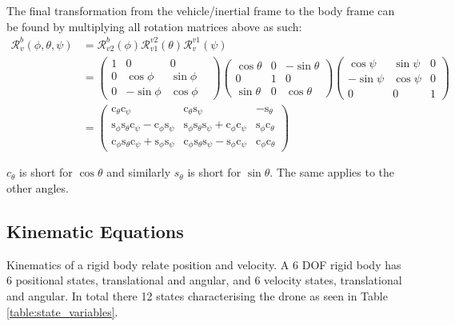 The final transformation from the vehicle/inertial frame to the body frame can be found by multiplying all rotation matrices above as such:
\begin{align}
\label{equation:trans_body_to_vehicle}
    \mathcal{R}_{v}^{b}(\phi, \theta, \psi) &= \mathcal{R}_{v2}^b(\phi)\mathcal{R}_{v1}^{v2}(\theta)\mathcal{R}_v^{v1}(\psi) &\\
    &= \begin{pmatrix}
        1 & 0 & 0\\
        0 & \cos\phi & \sin\phi &\\
        0 & -\sin\phi & \cos\phi
    \end{pmatrix}
    \begin{pmatrix}
        \cos\theta & 0 & -\sin\theta\\
        0 & 1 & 0\\
        \sin\theta & 0 &\cos\theta
    \end{pmatrix}
    \begin{pmatrix}
    \cos\psi & \sin\psi & 0\\
    -\sin\psi & \cos\psi & 0\\
    0 & 0 & 1
    \end{pmatrix} \nonumber
    \\
    &= \begin{pmatrix}
     \mbox{c}_{\theta}\mbox{c}_{\psi} & \mbox{c}_{\theta}\mbox{s}_{\psi} & -\mbox{s}_{\theta}\\
     \mbox{s}_{\phi}\mbox{s}_{\theta}\mbox{c}_{\psi} - \mbox{c}_{\phi}\mbox{s}_{\psi} & \mbox{s}_{\phi}\mbox{s}_{\theta}\mbox{s}_{\psi} + \mbox{c}_{\phi}\mbox{c}_{\psi} & \mbox{s}_{\phi}\mbox{c}_{\theta}\\
     \mbox{c}_{\phi}\mbox{s}_{\theta}\mbox{c}_{\psi} + \mbox{s}_{\phi}\mbox{s}_{\psi} & \mbox{c}_{\phi}\mbox{s}_{\theta}\mbox{s}_{\psi} - \mbox{s}_{\phi}\mbox{c}_{\psi} & \mbox{c}_{\phi}\mbox{c}_{\theta}
    \end{pmatrix}
\end{align}

\noindent $c_\theta$ is short for $\cos\theta$ and similarly $s_\theta$ is short for $\sin\theta$. The same applies to the other angles.

\subsection{Kinematic Equations}

Kinematics of a rigid body relate position and velocity. A 6 DOF rigid body has 6 positional states, translational and angular, and 6 velocity states, translational and angular. In total there 12 states characterising the drone as seen in Table \ref{table:state_variables}.

